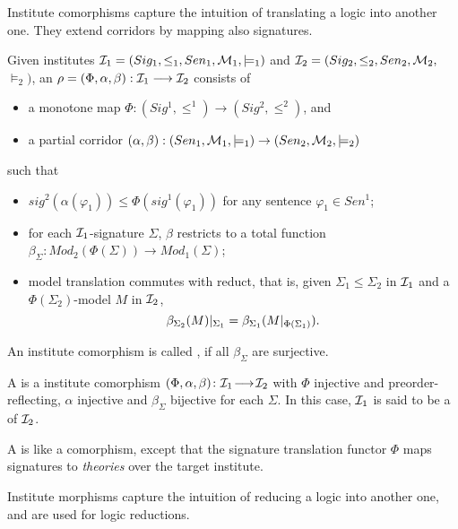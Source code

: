 \documentclass[%
\ifpretendfinal
final%
\else
draft%
\fi,
a4paper,
wd]{isov2}
\begin{document}
Institute comorphisms capture the intuition of translating a
logic into another one. They extend corridors by mapping also signatures.
\begin{definition}\label{def:sigroom-co}
Given institutes 
$\cI_1=(Sig_1,\leq_1,Sen_1,\cM_1,\models_1)$ and
$\cI_2=(Sig_2,\leq_2,Sen_2,\cM_2,$ ${\models_2)}$,
an   $\rho=(\Phi,\alpha,\beta):\cI_1\longrightarrow 
\cI_2$
 consists of
\begin{itemize}
  \item a monotone map $\Phi:(Sig^1,\leq^1)\to(Sig^2,\leq^2)$, and
  \item a partial corridor
  $(\alpha,\beta):{(Sen_1,\cM_1,\models_1)}\to {(Sen_2,\cM_2,\models_2)}$
\end{itemize}
such that
\begin{itemize}
  \item  $sig^2(\alpha(\varphi_1))\leq \Phi(sig^1(\varphi_1))$
  for any sentence $\varphi_1\in Sen^1$;
  \item for each $\cI_1$-signature $\Sigma$, $\beta$ restricts to
a total function $\beta_\Sigma:Mod_2(\Phi(\Sigma))\to Mod_1(\Sigma)$;
 \item model translation commutes with reduct, that is,
given $\Sigma_1\leq\Sigma_2$ in $\cI_1$ and a $\Phi(\Sigma_2)$-model
 $M$ in $\cI_2$,
$$\beta_{\Sigma_2}(M)|_{\Sigma_1}=\beta_{\Sigma_1}(M|_{\Phi(\Sigma_1)}).$$
\end{itemize}
\end{definition}
An institute comorphism is called , if
all $\beta_\Sigma$ are surjective.

A  is a institute comorphism
$(\Phi,\alpha,\beta)\map{\cI_1}{\cI_2}$ with $\Phi$ injective and
preorder-reflecting, $\alpha$ injective and $\beta_\Sigma$ bijective
for each $\Sigma$. In this case, $\cI_1$ is said to be a
 of $\cI_2$.

A  is like a comorphism, except
that the signature translation functor $\Phi$ maps signatures to
\emph{theories} over the target institute.

Institute morphisms capture the intuition of reducing a logic into
another one, and are used for logic reductions.
\end{document}
